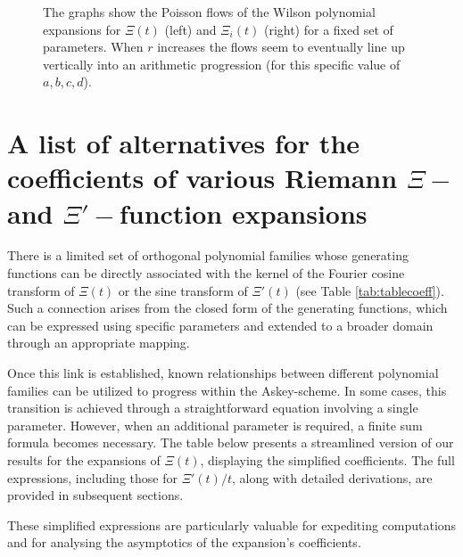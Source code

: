 \documentclass[a4paper,11pt,twoside]{amsart}
\begin{document}
\begin{small}
\begin{figure}[H]
  \caption{The graphs show the Poisson flows of the Wilson polynomial expansions for $\Xi(t)$ (left) and $\Xi_i(t)$ (right) for a fixed set of parameters. When $r$ increases the flows seem to eventually line up vertically into an arithmetic progression (for this specific value of $a,b,c,d$).}
  \label{fig:flowW2}
\end{figure}
\end{small}
\pagebreak

\renewcommand{\theequation}{B.\arabic{equation}}
\setcounter{equation}{0}
\section{A list of alternatives for the coefficients of various Riemann $\Xi-$ and $\Xi'-$function expansions}\label{specexpansions}

There is a limited set of orthogonal polynomial families whose generating functions can be directly associated with the kernel of the Fourier cosine transform of $\Xi(t)$ or the sine transform of $\Xi'(t)$ (see Table \ref{tab:tablecoeff}). Such a connection arises from the closed form of the generating functions, which can be expressed using specific parameters and extended to a broader domain through an appropriate mapping.

Once this link is established, known relationships between different polynomial families can be utilized to progress within the Askey-scheme. In some cases, this transition is achieved through a straightforward equation involving a single parameter. However, when an additional parameter is required, a finite sum formula becomes necessary. The table below presents a streamlined version of our results for the expansions of $\Xi(t)$, displaying the simplified coefficients. The full expressions, including those for $\Xi'(t)/t$, along with detailed derivations, are provided in subsequent sections. 

These simplified expressions are particularly valuable for expediting computations and for analysing the asymptotics of the expansion's coefficients.
\end{document}
